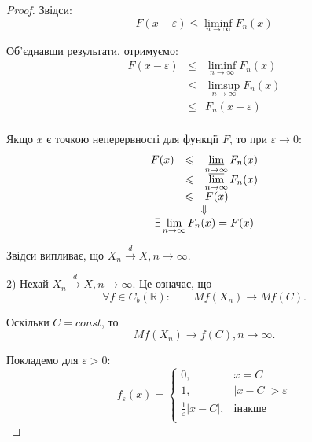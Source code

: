 \begin{proof}
    Звідси:
    $$F(x - \varepsilon)
    \leqslant \liminf\limits_{n \rightarrow \infty} F_n(x)$$

    Об'єднавши результати, отримуємо:
    $$ \begin{array}{rcl}
        F(x-\varepsilon) & \leqslant & \liminf_{n \rightarrow \infty} F_n(x) \\
        & \leqslant & \limsup_{n \rightarrow \infty} F_n(x) \\
        & \leqslant & F_n(x + \varepsilon) \\
    \end{array}$$
    
    Якщо $x$ є точкою неперервності для функції $F$, то
    при $\varepsilon \rightarrow 0$:
    $$\begin{array}{c}
        \begin{array}{rcl}
            F(x) & \leqslant & \varliminf\limits_{n \rightarrow \infty} F_n(x) \\
            & \leqslant & \varlimsup\limits_{n \rightarrow \infty} F_n(x) \\
            & \leqslant & F(x) \\
        \end{array}  \\
        
        \Downarrow  \\
    
        \exists \lim\limits_{n \rightarrow \infty} F_n(x) = F(x)  \\
    \end{array}$$

    Звідси випливає, що $X_n \xrightarrow{d} X, n \rightarrow \infty.$

    2) Нехай $X_n \xrightarrow{d} X, n \rightarrow \infty$. Це
    означає, що
    $$\forall f \in C_b(\mathbb{R}): \qquad Mf(X_n) \rightarrow Mf(C).$$

    Оскільки $C = const$, то
    $$Mf(X_n) \rightarrow f(C), n \rightarrow \infty.$$

    Покладемо для $\varepsilon > 0$:
    $$f_{\varepsilon}(x) = \left\{ \begin{array}{ll}
        0, & x = C \\
        1, & |x - C| > \varepsilon \\
        \frac{1}{\varepsilon}|x - C|, & \text{інакше} \\
    \end{array} \right.$$

    \beautifulImage


\end{proof}
